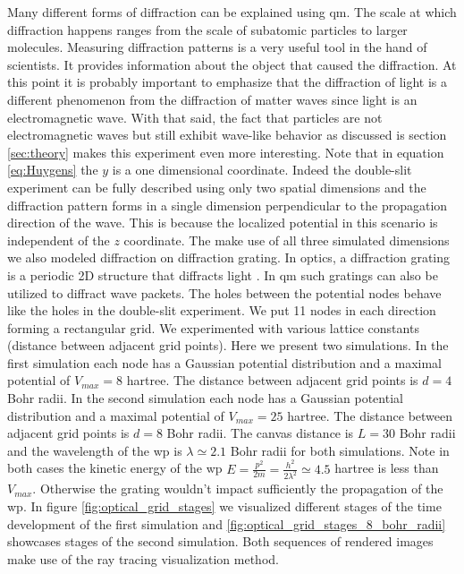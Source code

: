 Many different forms of diffraction can be explained using \acrshort{qm}.
The scale at which diffraction happens ranges from the scale of subatomic particles  to larger molecules.
Measuring diffraction patterns is a very useful tool in the hand of scientists.
It provides information about the object that caused the diffraction.
At this point it is probably important to emphasize that the diffraction of light is a different phenomenon from the diffraction of matter waves since light is an electromagnetic wave.
With that said, the fact that particles are not electromagnetic waves but still exhibit wave-like behavior as discussed is section \ref{sec:theory} makes this experiment even more interesting.
Note that in equation \ref{eq:Huygens} the $y$ is a one dimensional coordinate. Indeed the double-slit experiment can be fully described using only two spatial dimensions and the diffraction pattern forms in a single dimension perpendicular to the propagation direction of the wave.
This is because the localized potential in this scenario is independent of the $z$ coordinate.
The make use of all three simulated dimensions we also modeled diffraction on diffraction grating.
In optics, a diffraction grating is a periodic 2D structure that diffracts light \cite{Stroke1967}.
In \acrshort{qm} such gratings can also be utilized to diffract wave packets.
The holes between the potential nodes behave like the holes in the double-slit experiment.
We put 11 nodes in each direction forming a rectangular grid.
We experimented with various lattice constants (distance between adjacent grid points).
Here we present two simulations.
In the first simulation each node has a Gaussian potential distribution and a maximal potential of $V_{max} = 8$ hartree.
The distance between adjacent grid points is $d = 4$ Bohr radii.
In the second simulation each node has a Gaussian potential distribution and a maximal potential of $V_{max} = 25$ hartree.
The distance between adjacent grid points is $d = 8$ Bohr radii.
The canvas distance is $L=30$ Bohr radii and the wavelength of the \acrshort{wp} is $\lambda\simeq 2.1$ Bohr radii for both simulations.
Note in both cases the kinetic energy of the \acrshort{wp} $E = \frac{p^2}{2m} = \frac{h^2}{2\lambda^2} \simeq 4.5$ hartree is less than $V_{max}$.
Otherwise the grating wouldn't impact sufficiently the propagation of the \acrshort{wp}.
In figure \ref{fig:optical_grid_stages} we visualized different stages of the time development of the first simulation and \ref{fig:optical_grid_stages_8_bohr_radii} showcases stages of the second simulation.
Both sequences of rendered images make use of the ray tracing visualization method.

